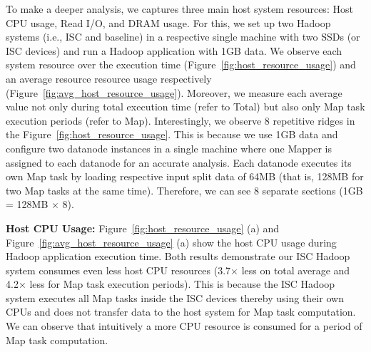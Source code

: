 To make a deeper analysis, we captures three main host system resources: Host CPU usage, Read I/O, and DRAM usage. For this, we set up two Hadoop systems (i.e., ISC and baseline) in a respective single machine with two SSDs (or ISC devices) and run a Hadoop application with 1GB data. We observe each system resource over the execution time (Figure~\ref{fig:host_resource_usage}) and an average resource resource usage respectively (Figure~\ref{fig:avg_host_resource_usage}). 
Moreover, we measure each average value not only during total execution time (refer to Total) but also only Map task execution periods (refer to Map). Interestingly, we observe 8 repetitive ridges in the Figure~\ref{fig:host_resource_usage}. This is because we use 1GB data and configure two datanode instances in a single machine where one Mapper is assigned to each datanode for an accurate analysis. Each datanode executes its own Map task by loading respective input split data of 64MB (that is, 128MB for two Map tasks at the same time). Therefore, we can see 8 separate sections (1GB = 128MB $\times$ 8).

\textbf{Host CPU Usage:} Figure~\ref{fig:host_resource_usage} (a) and Figure~\ref{fig:avg_host_resource_usage} (a) show the host CPU usage during Hadoop application execution time. Both results demonstrate our ISC Hadoop system consumes even less host CPU resources (3.7$\times$ less on total average and 4.2$\times$ less for Map task execution periods). This is because the ISC Hadoop system executes all Map tasks inside the ISC devices thereby using their own CPUs and does not transfer data to the host system for Map task computation. We can observe that intuitively a more CPU resource is consumed for a period of Map task computation.




